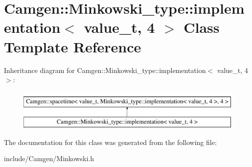 \hypertarget{a00300}{}\section{Camgen\+:\+:Minkowski\+\_\+type\+:\+:implementation$<$ value\+\_\+t, 4 $>$ Class Template Reference}
\label{a00300}
Inheritance diagram for Camgen\+:\+:Minkowski\+\_\+type\+:\+:implementation$<$ value\+\_\+t, 4 $>$\+:\begin{figure}[H]
\begin{center}
\leavevmode
\includegraphics[height=2.000000cm]{a00300}
\end{center}
\end{figure}


The documentation for this class was generated from the following file\+:\begin{DoxyCompactItemize}
\item 
include/\+Camgen/Minkowski.\+h\end{DoxyCompactItemize}
